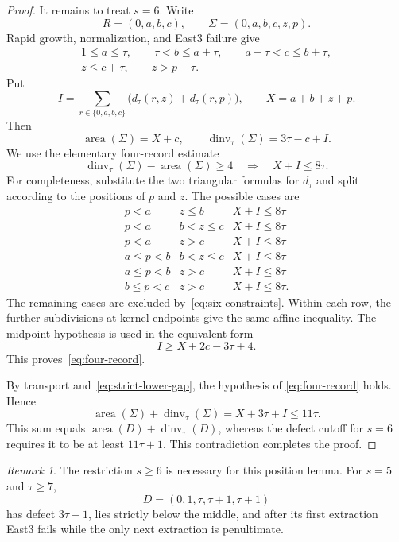 \documentclass[11pt]{article}
\theoremstyle{definition}
\theoremstyle{remark}
\newtheorem{remark}[theorem]{Remark}
\newcommand{\area}{\operatorname{area}}
\newcommand{\dinv}{\operatorname{dinv}}
\begin{document}
\begin{proof}
It remains to treat $s=6$.  Write
\[
  R=(0,a,b,c),
  \qquad \Sigma=(0,a,b,c,z,p).
\]
Rapid growth, normalization, and East3 failure give
\begin{equation}
\begin{gathered}
  1\le a\le\tau,
  \qquad \tau<b\le a+\tau,
  \qquad a+\tau<c\le b+\tau,\\
  z\le c+\tau,
  \qquad z>p+\tau.
\end{gathered}
\label{eq:six-constraints}
\end{equation}
Put
\[
 I=\sum_{r\in\{0,a,b,c\}}
 \bigl(d_\tau(r,z)+d_\tau(r,p)\bigr),
 \qquad X=a+b+z+p.
\]
Then
\begin{equation}
  \area(\Sigma)=X+c,
  \qquad \dinv_\tau(\Sigma)=3\tau-c+I.
  \label{eq:six-stats}
\end{equation}
We use the elementary four-record estimate
\begin{equation}
  \dinv_\tau(\Sigma)-\area(\Sigma)\ge4
  \quad\Longrightarrow\quad
  X+I\le8\tau.
  \label{eq:four-record}
\end{equation}
For completeness, substitute the two triangular formulas for $d_\tau$ and
split according to the positions of $p$ and $z$.  The possible cases are
\[
\begin{array}{c|c|c}
 p<a & z\le b & X+I\le8\tau\\
 p<a & b<z\le c & X+I\le8\tau\\
 p<a & z>c & X+I\le8\tau\\
 a\le p<b & b<z\le c & X+I\le8\tau\\
 a\le p<b & z>c & X+I\le8\tau\\
 b\le p<c & z>c & X+I\le8\tau.
\end{array}
\]
The remaining cases are excluded by~\eqref{eq:six-constraints}.  Within each
row, the further subdivisions at kernel endpoints give the same affine
inequality.  The midpoint hypothesis is used in the equivalent form
\[
  I\ge X+2c-3\tau+4.
\]
This proves~\eqref{eq:four-record}.

By transport and~\eqref{eq:strict-lower-gap}, the hypothesis of
\eqref{eq:four-record} holds.  Hence
\[
 \area(\Sigma)+\dinv_\tau(\Sigma)
 =X+3\tau+I\le11\tau.
\]
This sum equals $\area(D)+\dinv_\tau(D)$, whereas the defect cutoff for
$s=6$ requires it to be at least $11\tau+1$.  This contradiction completes
the proof.
\end{proof}

\begin{remark}
The restriction $s\ge6$ is necessary for this position lemma.  For
$s=5$ and $\tau\ge7$,
\[
  D=(0,1,\tau,\tau+1,\tau+1)
\]
has defect $3\tau-1$, lies strictly below the middle, and after its first
extraction East3 fails while the only next extraction is penultimate.
\end{remark}
\end{document}
